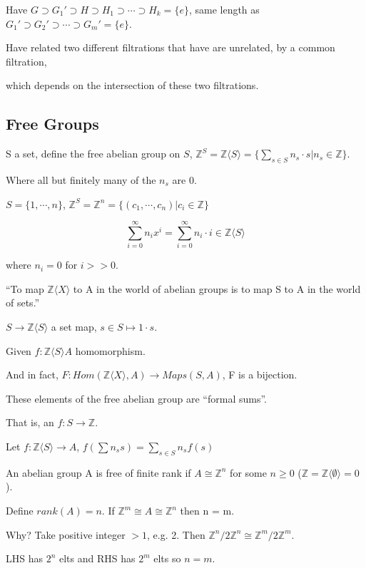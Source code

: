 \documentclass[12pt]{article}
\begin{document}
Have $G \supset G_1' \supset H \supset H_1 \supset \cdots \supset H_k = \{e\}$, same length as $G_1' \supset G_2' \supset \cdots \supset G_m' = \{e\}$.

Have related two different filtrations that have are unrelated, by a common filtration,

which depends on the intersection of these two filtrations.

\subsection{Free Groups}

S a set, define the free abelian group on $S$, $\mathds{Z}^S = \mathds{Z}\langle S\rangle = \{\sum_{s \in S} n_s \cdot s | n_s \in \mathds{Z}\}$.

Where all but finitely many of the $n_s$ are 0.

$S = \{1, \cdots, n\}$, $\mathds{Z}^S = \mathds{Z}^n = \{(c_1, \cdots, c_n) | c_i \in \mathds{Z}\}$

$$\sum_{i = 0}^\infty n_i x^i = \sum_{i = 0}^\infty n_i \cdot i \in \mathds{Z}\langle S \rangle$$

where $n_i = 0$ for $i >> 0$.

\noindent
``To map $\mathds{Z}\langle X\rangle$ to A in the world of abelian groups is to map S to A in the world of sets.''

$S \to \mathds{Z}\langle S \rangle$ a set map, $s \in S \mapsto 1 \cdot s$.

Given $f: \mathds{Z} \langle S \rangle A$ homomorphism.

And in fact, $F: Hom(\mathds{Z} \langle X\rangle, A) \to Maps(S, A)$, F is a bijection.

\noindent
These elements of the free abelian group are ``formal sums''.

That is, an $f: S \to \mathds{Z}$.

\noindent
Let $f: \mathds{Z}\langle S\rangle \to A$, $f(\sum n_ss) = \sum_{s \in S}n_sf(s)$

\noindent
An abelian group A is free of finite rank if $A \cong \mathds{Z}^n$ for some $n \geq 0$ ($\mathds{Z} = \mathds{Z}\langle \emptyset \rangle = 0$).

Define $rank(A) = n$.  If $\mathds{Z}^m \cong A \cong \mathds{Z}^n$ then n = m.

Why? Take positive integer $> 1$, e.g. 2.  Then $\mathds{Z}^n/2\mathds{Z}^n \cong \mathds{Z}^m/2\mathds{Z}^m$.

LHS has $2^n$ elts and RHS has $2^m$ elts so $n = m$. \\
\end{document}
